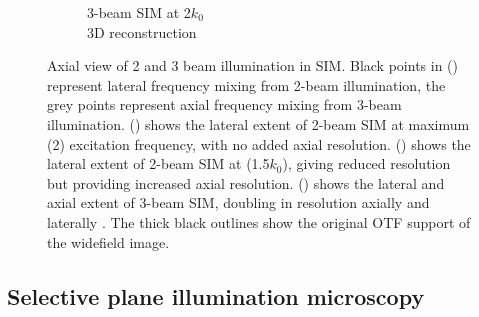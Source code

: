 \begin{figure}
\begin{subfigure}[t]{0.48\textwidth}
        \caption{3-beam SIM at \SI{2}{\times}$k_0$\\3D reconstruction}
        \label{fig:sim_axial_3_beam}
    \end{subfigure}\hfill
    \caption{
    Axial view of 2 and 3 beam illumination in \gls{SIM}.
    Black points in () represent lateral frequency mixing from 2-beam illumination, the grey points represent axial frequency mixing from 3-beam illumination.
    () shows the lateral extent of 2-beam \gls{SIM} at maximum (\SI{2}{\times}) excitation frequency, with no added axial resolution.
    () shows the lateral extent of 2-beam \gls{SIM} at (\SI{1.5}{\times}$k_0$), giving reduced resolution but providing increased axial resolution.
     () shows the lateral and axial extent of 3-beam \gls{SIM}, doubling in resolution axially and laterally \cite{gustasson}.
     The thick black outlines show the original OTF support of the widefield image.    %
    }
    \label{fig:sim_axial}
\end{figure}




\subsection{Selective plane illumination microscopy}

